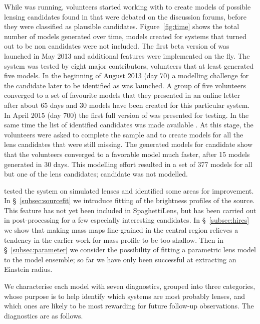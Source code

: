 While \SW was running, volunteers started working with \SpL to create models of possible lensing candidates found in \SW that were debated on the \SW discussion forums, before they were classified as plausible candidates.
Figure~\ref{fig:time} shows the total number of models generated over time, models created for systems that turned out to be non candidates were not included.
The first beta version of \SpL was launched in May 2013 and additional features were implemented on the fly.
The system was tested by eight major contributors, volunteers that at least generated five models.
In the beginning of August 2013 (day 70) a modelling challenge for the candidate later to be identified as  was launched.
A group of five volunteers converged to a set of favourite models that they presented in an online letter after about 65 days and 30 models have been created for this particular system.
In April 2015 (day 700) the first full version of \SpL was presented for testing.
In the same time the list of identified candidates was made available \citep[as a preprint of the later work][]{2016MNRAS.455.1191M}.
At this stage, the volunteers were asked to complete the sample and to create models for all the lens candidates that were still missing.
The generated models for candidate  show that the volunteers converged to a favorable model much faster, after 15 models generated in 30 days.
This modelling effort resulted in a set of 377 \SpL models for all but one of the  lens candidates; candidate  was not modelled.

\cite{2015MNRAS.447.2170K} tested the system
on simulated lenses and identified some areas for improvement.  In
\S~\ref{subsec:sourcefit} we introduce fitting of the brightness
profiles of the source.  This feature has not yet been included in
SpaghettiLens, but has been carried out in post-processing for a few
especially interesting candidates.  In \S~\ref{subsec:hires} we show
that making mass maps fine-grained in the central region relieves a
tendency in the earlier work for mass profile to be too shallow. Then in
\S~\ref{subsec:parameter} we consider the possibility of fitting a
parametric lens model to the model ensemble; so far we have only been
successful at extracting an Einstein radius.


We characterise each model with seven diagnostics, grouped into three 
categories, whose purpose is to help identify which systems are most probably 
lenses, and which ones are likely to be most rewarding for future follow-up 
observations. The diagnostics are as follows.

